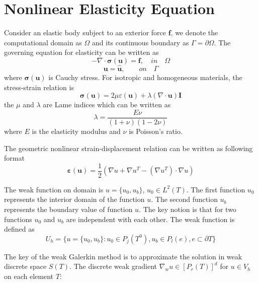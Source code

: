 \section{Nonlinear Elasticity Equation}

Consider an elastic body subject to an exterior force $ \mathbf{f} $, we denote the computational domain as $ \Omega $ and its continuous boundary as $ \Gamma = \partial \Omega $. The governing equation for elasticity can be written as
\begin{equation}
-\nabla \cdot \boldsymbol{\sigma(u)} = \mathbf{f}, \quad in \quad \Omega
\end{equation}
\begin{equation}
\mathbf{u} = \hat{\mathbf{u}},  \qquad on \quad \Gamma
\end{equation}
where $ \boldsymbol{\sigma(u)} $ is Cauchy stress. For isotropic and homogeneous materials, the stress-strain relation is
\begin{equation}
\boldsymbol{\sigma(u)} = 2\mu \varepsilon(\mathbf{u}) + \lambda (\nabla \cdot \mathbf{u}) \mathbf{I}
\end{equation}
the $ \mu $ and $ \lambda $ are Lame indices which can be written as
\begin{equation}
\lambda = \frac{E\nu}{(1 + \nu)(1 - 2\nu)}
\end{equation}
where $ E $ is the elasticity modulus and $ \nu $ is Poisson's ratio. 

The geometric nonlinear strain-displacement relation can be written as following format
\begin{equation}
\boldsymbol{\varepsilon(u)}= \frac{1}{2} (\nabla u + \nabla u^{T} - (\nabla u^{T}) \cdot \nabla u)
\end{equation}

The weak function on domain is $ u = \{u_0, u_b\} $, $ u_{0} \in L^{2} (T)$. The first function $ u_0 $ represents the interior domain of the function $ u $. The second function $ u_{b} $ represents the boundary value of function $ u $. The key notion is that for two functions $ u_0 $ and $ u_{b} $ are independent with each other. The weak function is defined as 
\begin{equation}
U_{h} = \{ u = \{u_{0}, u_{b} \}: u_{0} \in P_{j} (T^{0}), u_{b} \in P_{l} (e), e \subset \partial T \}
\end{equation}

The key of the weak Galerkin method is to approximate the solution in weak discrete space $ S(T) $. The discrete weak gradient $ \nabla_{w} u \in [P_{r} (T)]^{d} $ for $ u \in V_{h} $ on each element $ T $:

